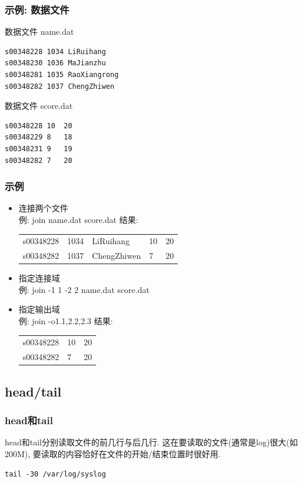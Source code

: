 \documentclass[compress]{beamer}
\begin{document}
\begin{frame}[fragile]
\frametitle{示例: 数据文件}

数据文件 name.dat
\begin{Verbatim}
s00348228 1034 LiRuihang 
s00348230 1036 MaJianzhu 
s00348281 1035 RaoXiangrong 
s00348282 1037 ChengZhiwen 
\end{Verbatim}

数据文件 score.dat
\begin{Verbatim}
s00348228 10  20 
s00348229 8   18
s00348231 9   19 
s00348282 7   20
\end{Verbatim}


\end{frame}

\begin{frame}[fragile]
\frametitle{示例}

\begin{itemize}
\item 连接两个文件 \\
例: join name.dat score.dat 结果:\\
\begin{tabular}{lllll}
s00348228 & 1034 & LiRuihang & 10 & 20\\
s00348282 & 1037 & ChengZhiwen & 7 & 20\\
\end{tabular} 

\item 指定连接域 \\
例: join -1 1 -2 2 name.dat score.dat

\item 指定输出域\\
例: join -o1.1,2.2,2.3
结果:\\
\begin{tabular}{lll}
s00348228 & 10 & 20\\
s00348282 & 7 & 20\\
\end{tabular}

\end{itemize}

\end{frame}

\subsection{head/tail}

\begin{frame}[fragile]
	\frametitle{head和tail}
head和tail分别读取文件的前几行与后几行. 这在要读取的文件(通常是log)很大(如200M), 要读取的内容恰好在文件的开始/结束位置时很好用. 

\begin{Verbatim}
tail -30 /var/log/syslog
\end{Verbatim}
\end{frame}
\end{document}
